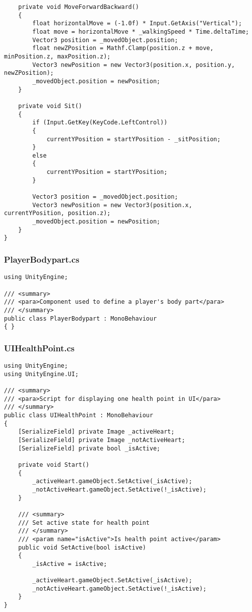 \begin{verbatim}
    private void MoveForwardBackward()
    {
        float horizontalMove = (-1.0f) * Input.GetAxis("Vertical");
        float move = horizontalMove * _walkingSpeed * Time.deltaTime;
        Vector3 position = _movedObject.position;
        float newZPosition = Mathf.Clamp(position.z + move, minPosition.z, maxPosition.z);
        Vector3 newPosition = new Vector3(position.x, position.y, newZPosition);
        _movedObject.position = newPosition;
    }

    private void Sit()
    {
        if (Input.GetKey(KeyCode.LeftControl))
        {
            currentYPosition = startYPosition - _sitPosition;
        }
        else
        {
            currentYPosition = startYPosition;
        }

        Vector3 position = _movedObject.position;
        Vector3 newPosition = new Vector3(position.x, currentYPosition, position.z);
        _movedObject.position = newPosition;
    }
}
\end{verbatim}
\subsubsection*{PlayerBodypart.cs}
\begin{verbatim}
using UnityEngine;

/// <summary>
/// <para>Component used to define a player's body part</para>
/// </summary>
public class PlayerBodypart : MonoBehaviour
{ }

\end{verbatim}
\subsubsection*{UIHealthPoint.cs}
\begin{verbatim}
using UnityEngine;
using UnityEngine.UI;

/// <summary>
/// <para>Script for displaying one health point in UI</para>
/// </summary>
public class UIHealthPoint : MonoBehaviour
{
    [SerializeField] private Image _activeHeart;
    [SerializeField] private Image _notActiveHeart;
    [SerializeField] private bool _isActive;

    private void Start()
    {
        _activeHeart.gameObject.SetActive(_isActive);
        _notActiveHeart.gameObject.SetActive(!_isActive);
    }

    /// <summary>
    /// Set active state for health point
    /// </summary>
    /// <param name="isActive">Is health point active</param>
    public void SetActive(bool isActive)
    {
        _isActive = isActive;

        _activeHeart.gameObject.SetActive(_isActive);
        _notActiveHeart.gameObject.SetActive(!_isActive);
    }
}
\end{verbatim}
